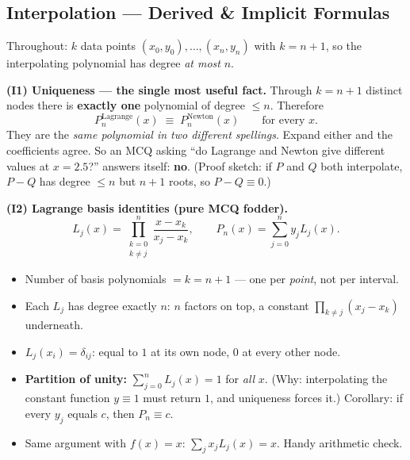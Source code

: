 \bigskip

\subsection{Interpolation --- Derived \& Implicit Formulas}

\begin{derivedbox}
Throughout: $k$ data points $(x_0,y_0),\dots,(x_n,y_n)$ with $k=n+1$, so the
interpolating polynomial has degree \emph{at most} $n$.

\medskip
\textbf{(I1) Uniqueness --- the single most useful fact.}
Through $k=n+1$ distinct nodes there is \textbf{exactly one} polynomial of degree
$\le n$. Therefore
\[
  P_n^{\text{Lagrange}}(x)\;\equiv\;P_n^{\text{Newton}}(x)
  \qquad\text{for every } x .
\]
They are the \emph{same polynomial in two different spellings}. Expand either and the
coefficients agree. So an MCQ asking ``do Lagrange and Newton give different values at
$x=2.5$?'' answers itself: \textbf{no}.
(Proof sketch: if $P$ and $Q$ both interpolate, $P-Q$ has degree $\le n$ but $n+1$ roots,
so $P-Q\equiv0$.)

\medskip
\textbf{(I2) Lagrange basis identities (pure MCQ fodder).}
\[
  L_j(x)=\prod_{\substack{k=0\\k\neq j}}^{n}\frac{x-x_k}{x_j-x_k},
  \qquad
  P_n(x)=\sum_{j=0}^{n} y_j L_j(x).
\]
\begin{itemize}
\item Number of basis polynomials $=k=n+1$ --- one per \emph{point}, not per interval.
\item Each $L_j$ has degree exactly $n$: $n$ factors on top, a constant
      $\prod_{k\ne j}(x_j-x_k)$ underneath.
\item $L_j(x_i)=\delta_{ij}$: equal to $1$ at its own node, $0$ at every other node.
\item \textbf{Partition of unity:} $\displaystyle\sum_{j=0}^{n}L_j(x)=1$ for \emph{all}
      $x$. (Why: interpolating the constant function $y\equiv1$ must return $1$, and
      uniqueness forces it.) Corollary: if every $y_j$ equals $c$, then $P_n\equiv c$.
\item Same argument with $f(x)=x$: $\sum_j x_j L_j(x)=x$. Handy arithmetic check.
\end{itemize}


\end{derivedbox}
